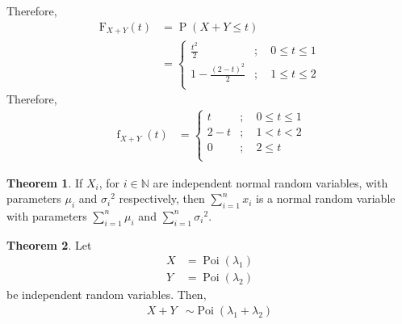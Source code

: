 \documentclass[titlepage, fleqn, a4paper, 12pt, twoside]{article}
\theoremstyle{definition}
\theoremstyle{theorem}
\newtheorem{theorem}{Theorem}
\DeclareMathOperator{\prob}{\mathrm{P}}
\DeclareMathOperator{\pdf}{\mathrm{f}}
\DeclareMathOperator{\poi}{\mathrm{Poi}}
\newcommand*{\cdf}[1]{\mathrm{F}_{#1}}
\begin{document}
\begin{solution}
	Therefore,
	\begin{align*}
		\cdf{X + Y}(t) &= \prob(X + Y \le t)\\
		&=
			\begin{cases}
				\frac{t^2}{2}           & ;\quad 0 \le t \le 1 \\
				1 - \frac{(2 - t)^2}{2} & ;\quad 1 \le t \le 2 \\
			\end{cases}
	\end{align*}
	Therefore,
	\begin{align*}
		\pdf_{X + Y}(t) &=
			\begin{cases}
				t     & ;\quad 0 \le t \le 1 \\
				2 - t & ;\quad 1 < t < 2     \\
				0     & ;\quad 2 \le t       \\
			\end{cases}
	\end{align*}
\end{solution}

\begin{theorem}
	If $X_i$, for $i \in \mathbb{N}$ are independent normal random variables, with parameters $\mu_i$ and ${\sigma_i}^2$ respectively, then $\sum\limits_{i = 1}^{n} x_i$ is a normal random variable with parameters $\sum\limits_{i = 1}^{n} \mu_i$ and $\sum\limits_{i = 1}^{n} {\sigma_i}^2$.
\end{theorem}

\begin{theorem}
	Let
	\begin{align*}
		X & = \poi(\lambda_1) \\
		Y & = \poi(\lambda_2)
	\end{align*}
	be independent random variables.
	Then,
	\begin{align*}
		X + Y & \sim \poi(\lambda_1 + \lambda_2)
	\end{align*}
\end{theorem}
\end{document}
